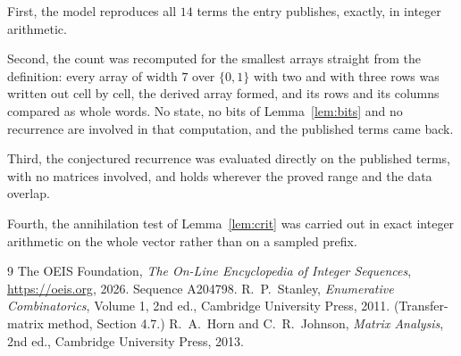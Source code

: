 \documentclass[11pt,a4paper]{article}
\theoremstyle{plain}
\theoremstyle{definition}
\begin{document}
First, the model reproduces all $14$ terms the entry publishes, exactly, in integer
arithmetic.

Second, the count was recomputed for the smallest arrays straight from the definition: every
array of width $7$ over $\{0,1\}$ with two and with three rows was written out cell by cell,
the derived array formed, and its rows and its columns compared as whole words. No state, no
bits of Lemma~\ref{lem:bits} and no recurrence are involved in that computation, and the
published terms came back.

Third, the conjectured recurrence was evaluated directly on the published terms, with no
matrices involved, and holds wherever the proved range and the data overlap.

Fourth, the annihilation test of Lemma~\ref{lem:crit} was carried out in exact integer
arithmetic on the whole vector rather than on a sampled prefix.

\begin{thebibliography}{9}
 The OEIS Foundation, \emph{The On-Line Encyclopedia of Integer
Sequences}, \url{https://oeis.org}, 2026. Sequence A204798.
 R.~P.~Stanley, \emph{Enumerative Combinatorics}, Volume 1, 2nd ed.,
Cambridge University Press, 2011. (Transfer-matrix method, Section 4.7.)
 R.~A.~Horn and C.~R.~Johnson, \emph{Matrix Analysis}, 2nd ed., Cambridge
University Press, 2013.
\end{thebibliography}
\end{document}
